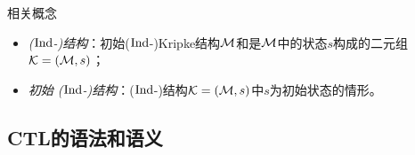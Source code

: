\documentclass[9pt, CJK]{beamer}
\begin{document}
\begin{frame}
{%
		\begin{block}{相关概念}
			\begin{itemize}
				\item \emph{($\textrm{Ind}$-)结构}：初始($\textrm{Ind}$-)Kripke结构${\cal M}$和是${\cal M}$中的状态$s$构成的二元组${\cal K}=({\cal M}, s)$；
				\item {\em 初始 ($\textrm{Ind}$-)结构}：($\textrm{Ind}$-)结构${\cal K}=({\cal M}, s)$中$s$为初始状态的情形。
			\end{itemize} 
		
		\end{block}
}
\end{frame}


\subsection{CTL的语法和语义}
\end{document}
